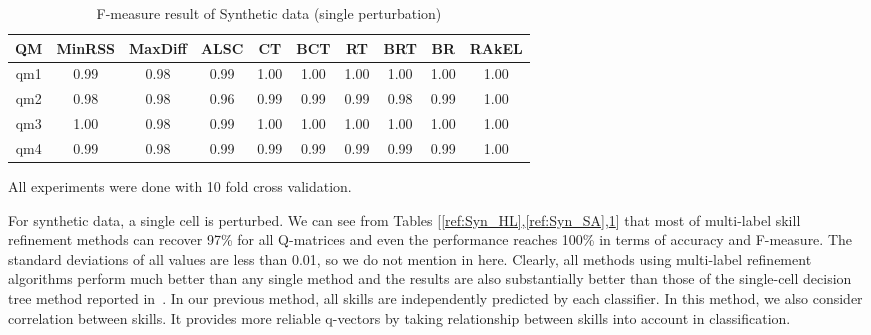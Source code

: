 \documentclass[12pt]{article}
\begin{document}
\begin {table}[h]
\scriptsize
\centering
\begin{tabular}{c|c|c|c|c|c|c|c|c|c}	
	\hline\hline	
QM & MinRSS & MaxDiff & ALSC & CT & BCT & RT & BRT & BR & RAkEL \\ \hline
qm1 & 0.99 & 0.98 & 0.99 & 1.00 & 1.00 & 1.00 & 1.00 & 1.00 & 1.00 \\
qm2 & 0.98 & 0.98 & 0.96 & 0.99 & 0.99 & 0.99 & 0.98 & 0.99 & 1.00 \\
qm3 & 1.00 & 0.98 & 0.99 & 1.00 & 1.00 & 1.00 & 1.00 & 1.00 & 1.00 \\
qm4 & 0.99 & 0.98 & 0.99 & 0.99 & 0.99 & 0.99 & 0.99 & 0.99 & 1.00 \\
\hline\hline
\end{tabular}
\caption {F-measure result of Synthetic data (single perturbation)} \label{ref:Syn_FM}
\end{table}

All experiments were done with 10 fold cross validation.

 
 For synthetic data, a single cell is perturbed. We can see from Tables [\ref{ref:Syn_HL},\ref{ref:Syn_SA},\ref{ref:Syn_FM}] that most of multi-label skill refinement methods can recover 97\% for all
Q-matrices and even the performance reaches 100\% in terms of accuracy
and F-measure. The standard deviations of all values are less than 0.01, so we do not mention in here. Clearly, all methods using multi-label refinement algorithms perform much better than any single method and the results are also substantially better than those of the single-cell decision tree method reported in~\cite{desmarais2015combining}. In our previous method, all skills are independently predicted by each classifier. In this method, we also consider correlation between skills. It provides more reliable q-vectors by taking relationship between skills into account in classification.%
\end{document}
